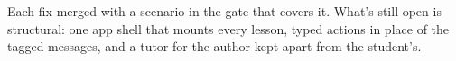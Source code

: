 \documentclass[11pt]{article}
\begin{document}
\vspace{10pt}
Each fix merged with a scenario in the gate that covers it. What's still open is structural: one
app shell that mounts every lesson, typed actions in place of the tagged messages, and a tutor
for the author kept apart from the student's.

\end{document}
